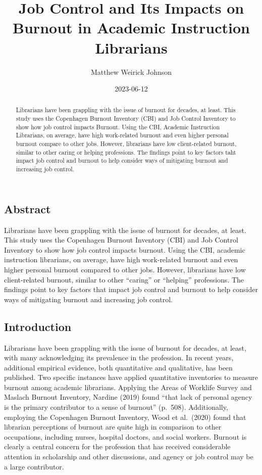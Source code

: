 \documentclass[
  twocolumn]{article}
\title{Job Control and Its Impacts on Burnout in Academic Instruction
Librarians}
\author{Matthew Weirick Johnson}
\date{2023-06-12}
\begin{document}
\maketitle
\begin{abstract}
Librarians have been grappling with the issue of burnout for decades, at
least. This study uses the Copenhagen Burnout Inventory (CBI) and Job
Control Inventory to show how job control impacts Burnout. Using the
CBI, Academic Instruction Librarians, on average, have high work-related
burnout and even higher personal burnout compare to other jobs. However,
librarians have low client-related burnout, similar to other caring or
helping professions. The findings point to key factors taht impact job
control and burnout to help consider ways of mitigating burnout and
increasing job control.
\end{abstract}


\subsection{Abstract}\label{abstract}

Librarians have been grappling with the issue of burnout for decades, at
least. This study uses the Copenhagen Burnout Inventory (CBI) and Job
Control Inventory to show how job control impacts burnout. Using the
CBI, academic instruction librarians, on average, have high work-related
burnout and even higher personal burnout compared to other jobs.
However, librarians have low client-related burnout, similar to other
``caring'' or ``helping'' professions. The findings point to key factors
that impact job control and burnout to help consider ways of mitigating
burnout and increasing job control.

\subsection{Introduction}\label{introduction}

Librarians have been grappling with the issue of burnout for decades, at
least, with many acknowledging its prevalence in the profession. In
recent years, additional empirical evidence, both quantitative and
qualitative, has been published. Two specific instances have applied
quantitative inventories to measure burnout among academic librarians.
Applying the Areas of Worklife Survey and Maslach Burnout Inventory,
Nardine (2019) found ``that lack of personal agency is the primary
contributor to a sense of burnout'' (p.~508). Additionally, employing
the Copenhagen Burnout Inventory, Wood et al.~(2020) found that
librarian perceptions of burnout are quite high in comparison to other
occupations, including nurses, hospital doctors, and social workers.
Burnout is clearly a central concern for the profession that has
received considerable attention in scholarship and other discussions,
and agency or job control may be a large contributor.
\end{document}
